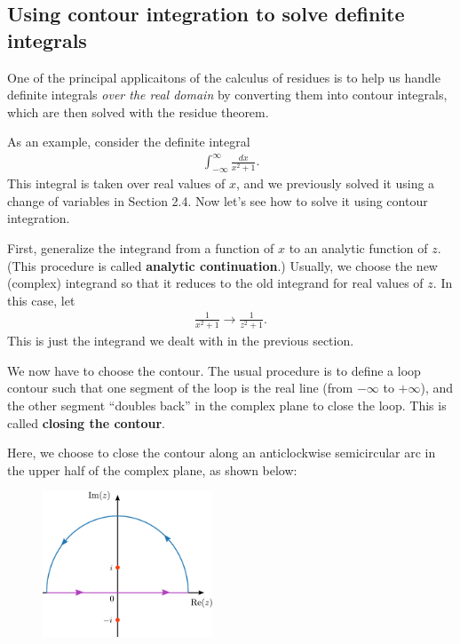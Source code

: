 \documentclass[10pt,a4paper]{article}
\begin{document}
\subsection{Using contour integration to solve definite integrals}
\label{using-contours-to-solve-integrals}

One of the principal applicaitons of the calculus of residues is to
help us handle definite integrals \textit{over the real domain} by
converting them into contour integrals, which are then solved with the
residue theorem.

As an example, consider the definite integral
\begin{align}
  \int_{-\infty}^\infty \frac{dx}{x^2 + 1}.
\end{align}
This integral is taken over real values of $x$, and we previously
solved it using a change of variables in Section 2.4.  Now let's see
how to solve it using contour integration.

First, generalize the integrand from a function of $x$ to an analytic
function of $z$.  (This procedure is called \textbf{analytic
  continuation}.)  Usually, we choose the new (complex) integrand so
that it reduces to the old integrand for real values of $z$. In this
case, let
\begin{align}
  \frac{1}{x^2 + 1} \rightarrow \frac{1}{z^2 + 1}.
\end{align}
This is just the integrand we dealt with in the previous section.

We now have to choose the contour.  The usual procedure is to define a
loop contour such that one segment of the loop is the real line (from
$-\infty$ to $+\infty$), and the other segment ``doubles back'' in the
complex plane to close the loop.  This is called \textbf{closing the
  contour}.

Here, we choose to close the contour along an anticlockwise
semicircular arc in the upper half of the complex plane, as shown
below:

\begin{figure}[ht]
  \centering\includegraphics[width=0.45\textwidth]{closing_contour}
\end{figure}
\end{document}
